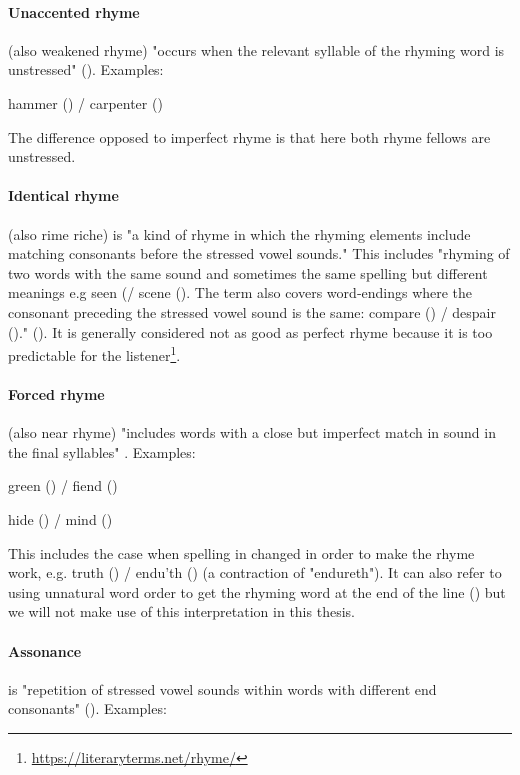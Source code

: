 \paragraph{Unaccented rhyme} (also weakened rhyme) "occurs when the relevant syllable of the rhyming word is unstressed" (\cite{britannica}). Examples: 

hammer () / carpenter ()

\noindent The difference opposed to imperfect rhyme is that here both rhyme fellows are unstressed.


\paragraph{Identical rhyme} (also rime riche) is "a kind of rhyme in which the rhyming elements include matching consonants before the stressed vowel sounds." This includes "rhyming of two words with the same sound and sometimes the same spelling but different meanings e.g seen (/ scene (). The term also covers word‐endings where the consonant preceding the stressed vowel sound is the same: compare () / despair ()." (\cite{oxforddict2008literary}). It is generally considered not as good as perfect rhyme because it is too predictable for the listener\footnote{\url{https://literaryterms.net/rhyme/}}.

\paragraph{Forced rhyme} (also near rhyme) "includes words with a close but imperfect match in sound in the final syllables" \cite{bergman2017litcharts}. Examples: 

green () / fiend ()

hide () / mind ()

\noindent This includes the case when spelling in changed in order to make the rhyme work, e.g. truth () / endu'th () (a contraction of "endureth"). It can also refer to using unnatural word order to get the rhyming word at the end of the line (\cite{bergman2017litcharts}) but we will not make use of this interpretation in this thesis.

\paragraph{Assonance} is "repetition of stressed vowel sounds within words with different end consonants" (\cite{britannica}). Examples:	

